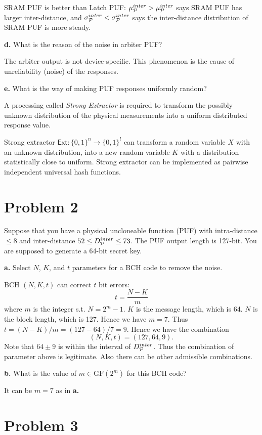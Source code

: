 \documentclass[12pt]{article}
\theoremstyle{plain}
\begin{document}
\Sol SRAM PUF is better than Latch PUF: $\mu_{\mathcal{P}}^{inter} > \mu_{\mathcal{P}}^{inter}$ says SRAM PUF has larger inter-distance, and $\sigma_{\mathcal{P}}^{inter} < \sigma_{\mathcal{P}}^{inter}$ says the inter-distance distribution of SRAM PUF is more steady.


{\bf d.} What is the reason of the noise in arbiter PUF?

\Sol The arbiter output is not device-specific. This
phenomenon is the cause of unreliability (noise) of the responses.

{\bf e.} What is the way of making PUF responses uniformly random?

\Sol A processing called \emph{Strong Extractor} is required to transform the possibly unknown distribution of
the physical measurements into a uniform distributed response value.

Strong extractor $\textsf{Ext} : \{0,1\}^n \to \{0,1\}^l$ can transform a random variable $X$ with an unknown distribution, into a new random variable $K$ with a distribution statistically close to uniform.
Strong extractor can be implemented as pairwise independent universal hash functions.

\section{Problem 2}
Suppose that you have a physical uncloneable function (PUF) with
intra-distance $\leq 8$ and inter-distance $52 \leq D_{\mathcal{P}}^{inter} \leq 73$. The PUF
output length is 127-bit. You are supposed to generate a 64-bit secret
key.

{\bf a.} Select $N$, $K$, and $t$ parameters for a BCH code to remove the noise.

\Sol BCH $(N,K,t)$ can correct $t$ bit errors:
$$t = \frac{N-K}{m}$$
where $m$ is the integer s.t. $N = 2^m-1$.
$K$ is the message length, which is 64. $N$ is the block length, which is 127. Hence we have $m=7$.
Thus $t = (N-K)/m = (127-64)/7 = 9$. Hence we have the combination
$$(N,K,t) = (127, 64, 9).$$
Note that $64 \pm 9$ is within the interval of $D_{\mathcal{P}}^{inter}$. Thus the combination of parameter above is legitimate. Also there can be other admissible combinations.

\newcommand{\GF}{\textrm{GF}}
{\bf b.} What is the value of $m \in \GF(2^m)$ for this BCH code?

\Sol It can be $m=7$ as in {\bf a.}

\section{Problem 3}
\end{document}
